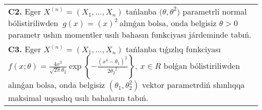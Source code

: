 \documentclass{article}
\begin{document}
\begin{tabular}{m{17cm}}
\textbf{C2.} 
Eger \(X^{(n)} = \left( X_{1},...,X_{n} \right)\) tańlanba \({(\theta,\theta}^{2})\) parametrli normal bólistiriliwden \({\ g(x) = (x)}^{2}\ \)alınǵan bolsa, onda belgisiz \(\theta > 0\) parametr ushın momentler usılı bahasın funkciyası járdeminde tabıń.
 \\
\textbf{C3.} 
Eger \(X^{(n)} = \left( X_{1},...,X_{n} \right)\) tańlanba tıǵızlıq funkciyası
$f(x;\theta) = \frac{4x^{3}}{\sqrt{2\pi}\theta_{2}}\exp\left\{ - \frac{\left( x^{4} - \theta_{1} \right)^{2}}{2{\theta_{2}}^{2}} \right\},\ x \in R$
bolǵan bólistiriliwden alınǵan bolsa, onda belgisiz \(\left( \theta_{1},\theta_{2}^{2} \right)\) vektor parametrdiń shınlıqqa maksimal uqsaslıq usılı bahaların tabıń.
 \\

\end{tabular}
\vspace{1cm}
\end{document}
